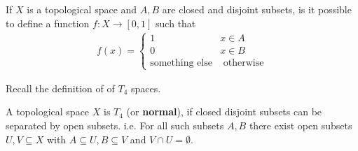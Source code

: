 If $X$ is a topological space and $A,B$ are closed and disjoint subsets, is it possible to define a function $f: X \to [0,1]$ such that
\begin{align*}
  f(x) = \left\{\begin{array}{ll}
    1 & x \in A\\
    0 & x \in B\\
    \text{something else} & \text{ otherwise}
  \end{array} \right.
\end{align*}


Recall the definition of of $T_4$ spaces.
\begin{dfn}[]
  A topological space $X$ is $T_4$ (or \textbf{normal}), if closed disjoint subsets can be separated by open subsets.
  i.e. For all such subsets $A,B$ there exist open subsets $U,V \subseteq X$ with $A \subseteq U, B \subseteq V$ and $V \cap U = \emptyset$.
\end{dfn}




